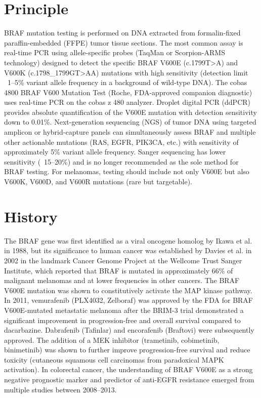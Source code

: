\section*{Principle}
BRAF mutation testing is performed on DNA extracted from formalin-fixed paraffin-embedded (FFPE) tumor tissue sections. The most common assay is real-time PCR using allele-specific probes (TaqMan or Scorpion-ARMS technology) designed to detect the specific BRAF V600E (c.1799T>A) and V600K (c.1798\_1799GT>AA) mutations with high sensitivity (detection limit ~1--5\% variant allele frequency in a background of wild-type DNA). The cobas 4800 BRAF V600 Mutation Test (Roche, FDA-approved companion diagnostic) uses real-time PCR on the cobas z 480 analyzer. Droplet digital PCR (ddPCR) provides absolute quantification of the V600E mutation with detection sensitivity down to 0.01\%. Next-generation sequencing (NGS) of tumor DNA using targeted amplicon or hybrid-capture panels can simultaneously assess BRAF and multiple other actionable mutations (RAS, EGFR, PIK3CA, etc.) with sensitivity of approximately 5\% variant allele frequency. Sanger sequencing has lower sensitivity (~15--20\%) and is no longer recommended as the sole method for BRAF testing. For melanomas, testing should include not only V600E but also V600K, V600D, and V600R mutations (rare but targetable).

\section*{History}
The BRAF gene was first identified as a viral oncogene homolog by Ikawa et al. in 1988, but its significance to human cancer was established by Davies et al. in 2002 in the landmark Cancer Genome Project at the Wellcome Trust Sanger Institute, which reported that BRAF is mutated in approximately 66\% of malignant melanomas and at lower frequencies in other cancers. The BRAF V600E mutation was shown to constitutively activate the MAP kinase pathway. In 2011, vemurafenib (PLX4032, Zelboraf) was approved by the FDA for BRAF V600E-mutated metastatic melanoma after the BRIM-3 trial demonstrated a significant improvement in progression-free and overall survival compared to dacarbazine. Dabrafenib (Tafinlar) and encorafenib (Braftovi) were subsequently approved. The addition of a MEK inhibitor (trametinib, cobimetinib, binimetinib) was shown to further improve progression-free survival and reduce toxicity (cutaneous squamous cell carcinomas from paradoxical MAPK activation). In colorectal cancer, the understanding of BRAF V600E as a strong negative prognostic marker and predictor of anti-EGFR resistance emerged from multiple studies between 2008--2013.

